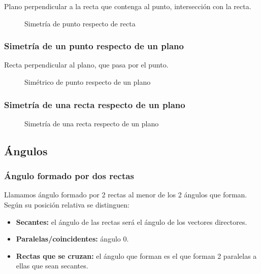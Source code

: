 Plano perpendicular a la recta que contenga al punto, intersección con la recta.

\begin{figure}[hbtp]
\centering
{}

\label{fig::sim::punto-recta}
\caption{Simetría de punto respecto de recta}
\end{figure}


\subsubsection{Simetría de un punto respecto de un plano}

Recta perpendicular al plano, que pasa por el punto.

\begin{figure}[hbtp]
\centering
{}

\label{fig::sim::punto-plano}
\caption{Simétrico de punto respecto de un plano}
\end{figure}



\subsubsection{Simetría de una recta respecto de un plano}

\begin{figure}[hbtp]
\centering
{}

\label{fig::sim::recta-plano}
\caption{Simetría de una recta respecto de un plano}
\end{figure}



\newpage
\subsection{Ángulos}
\subsubsection{Ángulo formado por dos rectas}

Llamamos ángulo formado por 2 rectas al menor de los 2 ángulos que forman. Según su posición relativa se distinguen:

\begin{itemize}
  \item \textbf{Secantes:} el ángulo de las rectas será el ángulo de los vectores directores.
  \item \textbf{Paralelas/coincidentes:} ángulo 0.
  \item \textbf{Rectas que se cruzan:} el ángulo que forman es el que forman 2 paralelas a ellas que sean secantes. 
\end{itemize}

